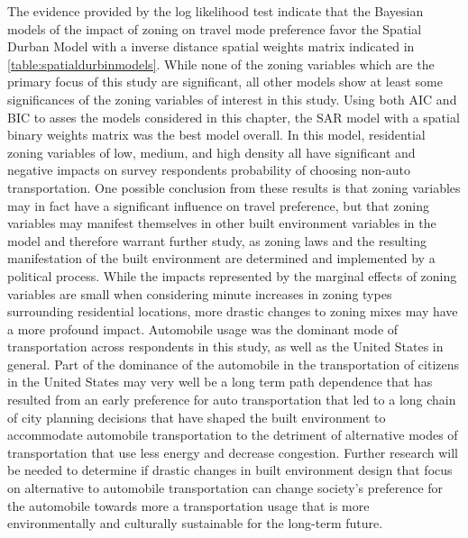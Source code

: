 The evidence provided by the log likelihood test indicate that the Bayesian models of the impact of zoning on travel mode preference favor the Spatial Durban Model with a inverse distance spatial weights matrix indicated in \autoref{table:spatialdurbinmodels}.   While none of the zoning variables which are the primary focus of this study are significant, all other models show at least some significances of the zoning variables of interest in this study.   Using both AIC and BIC to asses the models considered in this chapter, the SAR model with a spatial binary weights matrix was the best model overall.  In this model, residential zoning variables of low, medium, and high density all have significant and negative impacts on survey respondents probability of choosing non-auto transportation.  One possible conclusion from these results is that zoning variables may in fact have a significant influence on travel preference, but that zoning variables may manifest themselves in other built environment variables in the model and therefore warrant further study, as zoning laws and the resulting manifestation of the built environment are determined and implemented by a political process.  While the impacts represented by the marginal effects of zoning variables are small when considering minute increases in zoning types surrounding residential locations, more drastic changes to zoning mixes may have a more profound impact.  Automobile usage was the dominant mode of transportation across respondents in this study, as well as the United States in general.  Part of the dominance of the automobile in the transportation of citizens in the United States may very well be a long term path dependence that has resulted from an early preference for auto transportation that led to a long chain of city planning decisions that have shaped the built environment to accommodate automobile transportation to the detriment of alternative modes of transportation that use less energy and decrease congestion.  Further research will be needed to determine if drastic changes in built environment design that focus on alternative to automobile transportation can change society's preference for the automobile towards more a transportation usage that is more environmentally and culturally sustainable for the long-term future.
%
%
\appendix
\chapter{} \label{app: A}
\begin{singlespace}
	
\end{singlespace}


